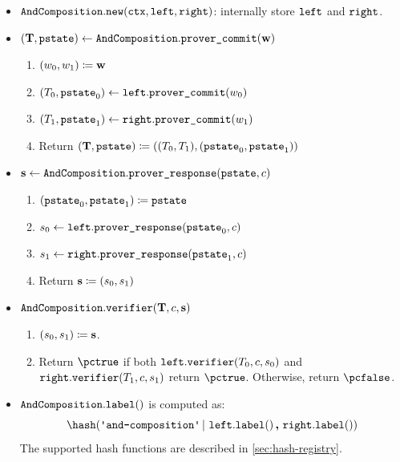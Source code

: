 \documentclass[11pt]{article}
\begin{document}
\begin{itemize}
  \item
  $\texttt{AndComposition}.\texttt{new}(\texttt{ctx}, \texttt{left}, \texttt{right})$: internally store $\texttt{left}$ and $\texttt{right}$.
  \item
  $(\mathbf {T}, \texttt{pstate})\gets \texttt{AndComposition}.\texttt{prover\_commit}(\mathbf {w})$
    \begin{enumerate}
      \item
        $(w_0,w_1)\coloneqq \mathbf {w}$
      \item
        $(T_0,\texttt{pstate}_0)\gets\texttt{left}.\texttt{prover\_commit}(w_0)$
      \item $(T_1,\texttt{pstate}_1)\gets\texttt{right}.\texttt{prover\_commit}(w_1)$
      \item
	Return $(\mathbf {T},\texttt{pstate}) \coloneqq ((T_0,  T_1),(\texttt{pstate}_0,\texttt{pstate}_1))$
    \end{enumerate}
  \item
  $\mathbf {s} \gets \texttt{AndComposition}.\texttt{prover\_response}(\texttt{pstate}, c)$
  \begin{enumerate}
      \item
	    $(\texttt{pstate}_0,\texttt{pstate}_1)\coloneqq \texttt{pstate}$
      \item
      $s_0\gets\texttt{left}.\texttt{prover\_response}(\texttt{pstate}_0, c)$
      \item
      $s_1\gets\texttt{right}.\texttt{prover\_response}(\texttt{pstate}_1, c)$
      \item
      Return $\mathbf {s}\coloneqq(s_0,s_1)$
    \end{enumerate}
  \item
  $\texttt{AndComposition}.\texttt{verifier}(\mathbf {T}, c, \mathbf {s})$
  \begin{enumerate}
      \item
        $(s_0,s_1)\coloneqq \mathbf {s}$.
      \item
	Return $\accept$ if both $\texttt{left}.\texttt{verifier}(T_0,c, s_0)$ and $\texttt{right}.\texttt{verifier}(T_1,c, s_1)$ return $\accept$. Otherwise, return $\reject$.
    \end{enumerate}
  \item  $\texttt{AndComposition}.\texttt{label}()$ is computed as:
    \[
     \hash(\andlabel \concatblock \leftbranch.\labeltt() \concat \rightbranch.\labeltt())
   \]
   The supported hash functions are described in \cref{sec:hash-registry}.

\end{itemize}
\end{document}
